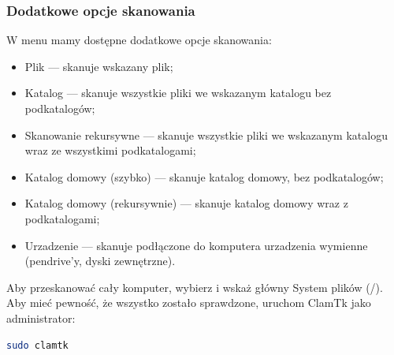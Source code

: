 \subsubsection{Dodatkowe opcje skanowania}
W menu  mamy dostępne dodatkowe opcje skanowania:
\begin{itemize}
\item \textcolor{ubuntu_orange}{Plik} --- skanuje wskazany plik;
\item \textcolor{ubuntu_orange}{Katalog} --- skanuje wszystkie pliki we wskazanym katalogu bez podkatalogów;
\item \textcolor{ubuntu_orange}{Skanowanie rekursywne} --- skanuje wszystkie pliki we wskazanym katalogu wraz ze wszystkimi podkatalogami;
\item \textcolor{ubuntu_orange}{Katalog domowy (szybko)} --- skanuje katalog domowy, bez podkatalogów;
\item \textcolor{ubuntu_orange}{Katalog domowy (rekursywnie)} --- skanuje katalog domowy wraz z podkatalogami;
\item \textcolor{ubuntu_orange}{Urzadzenie} --- skanuje podłączone do komputera urzadzenia wymienne (pendrive'y, dyski zewnętrzne).
\end{itemize}

Aby przeskanować cały komputer, wybierz  i wskaż główny \textcolor{ubuntu_orange}{System plików} (/). Aby mieć pewność, że wszystko zostało sprawdzone, uruchom ClamTk jako administrator:
\begin{lstlisting}[language=bash]
sudo clamtk
\end{lstlisting}
